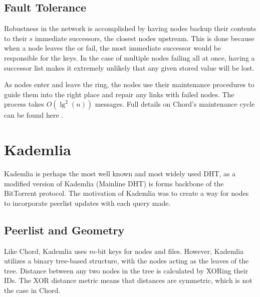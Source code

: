 \subsection*{Fault Tolerance}
Robustness in the network is accomplished by having nodes backup their contents to their $s$ immediate successors, the closest nodes upstream. 
This is done because when a node leaves the or fail, the most immediate successor would be responsible for the keys.
In the case of multiple nodes failing all at once, having a successor list makes it extremely unlikely that any given stored value will be lost.

As nodes enter and leave the ring, the nodes use their maintenance procedures to guide them into the right place and repair any links with failed nodes.  
The process takes $O(\lg^{2}(n))$ messages.
Full details on Chord's maintenance cycle can be found here \cite{chord}.






\section{Kademlia}
Kademlia \cite{kademlia}  is perhaps the most well known and most widely used DHT, as a modified version of Kademlia (Mainline DHT) is forms backbone of the BitTorrent protocol.
The motivation of Kademlia was to create a way for nodes to incorporate peerlist updates with each query made.


\subsection*{Peerlist and Geometry}
Like Chord, Kademlia uses $m$-bit keys for nodes and files.
However, Kademlia utilizes a binary tree-based structure, with the nodes acting as the leaves of the tree.
Distance between any two nodes in the tree  is calculated by XORing their IDs.
The XOR distance metric means that distances are symmetric, which is not the case in Chord.


